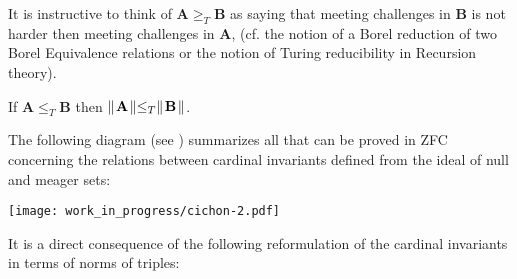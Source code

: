 It is instructive to think of $\mathbf A\geq_T \mathbf B$ as saying that meeting challenges in $\mathbf B$ is not harder then meeting challenges in $\mathbf A$,
(cf. the notion of a Borel reduction of two Borel Equivalence relations or the notion of Turing reducibility in Recursion theory).

\begin{obs} If ${\mathbf A}\leq_T{\mathbf B}$ then $\parallel\!{\mathbf A}\!\parallel\leq_T\parallel\!{\mathbf B}\!\parallel$.
\end{obs}

The following diagram (see \cite{Fre:84}) summarizes all that can be proved in ZFC concerning the relations between cardinal invariants defined
from the ideal of null and meager sets:

\begin{theorem}
%
\end{theorem}
\begin{center}
\texttt{[image: work\_in\_progress/cichon-2.pdf]}
\end{center}

It is a direct consequence of the following reformulation of the cardinal invariants in terms of norms of triples:

